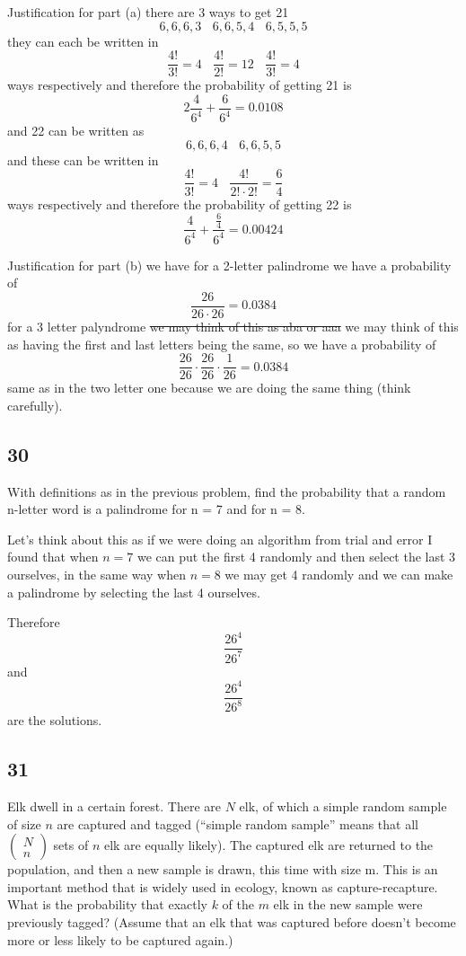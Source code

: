 \documentclass{article}
\begin{document}
Justification for part (a) there are 3 ways to get 21 $$ 6,6,6,3 ~~~~ 6,6,5,4 ~~~~ 6,5,5,5$$
they can each be written in $$\frac{4!}{3!}=4 ~~~~ \frac{4!}{2!}=12 ~~~~ \frac{4!}{3!}=4$$ ways respectively and therefore the probability of getting 21 is $$ 2 \frac{4}{6^4}+\frac{6}{6^4} = 0.0108$$and 22 can be written as $$6,6,6,4~~~~ 6,6,5,5$$ and these can be written in $$ \frac{4!}{3!}=4 ~~~~ \frac{4!}{2! \cdot 2!}= \frac{6}{4}$$ ways respectively and therefore the probability of getting 22 is $$\frac{4}{6^4}+ \frac{\frac{6}{4}} {6^4}=0.00424$$



Justification for part (b) we have for a 2-letter palindrome we have a probability of$$\frac{26}{26 \cdot 26}=0.0384$$ for a 3 letter palyndrome \sout{we may think of this as aba or aaa} we may think of this as having the first and last letters being the same, so we have a probability of $$\frac{26}{26} \cdot \frac{26}{26} \cdot \frac{1}{26}=0.0384$$ same as in the two letter one because we are doing the same thing (think carefully).
\subsection{30}
With deﬁnitions as in the previous problem, ﬁnd the probability that a random n-letter word is a palindrome for n = 7 and for n = 8. 

Let's think about this as if we were doing an algorithm from trial and error I found that when $n=7$ we can put the first 4 randomly and then select the last 3 ourselves, in the same way when $n=8$ we may get 4 randomly and we can make a palindrome by selecting the last 4 ourselves.

Therefore
$$\frac{26^4}{26^7}$$ and $$\frac{26^4}{26^8}$$ are the solutions.
\subsection{31}
Elk dwell in a certain forest. There are $N$ elk, of which a simple random sample of size $n$ are captured and tagged (“simple random sample” means that all $\begin{pmatrix}
N\\
n
\end{pmatrix}$ sets of $n$ elk are equally likely). The captured elk are returned to the population, and then a new sample is drawn, this time with size m. This is an important method that is widely used in ecology, known as capture-recapture. What is the probability that exactly $k$ of the $m$ elk in the new sample were previously tagged? (Assume that an elk that was captured before doesn’t become more or less likely to be captured again.) 
\end{document}
